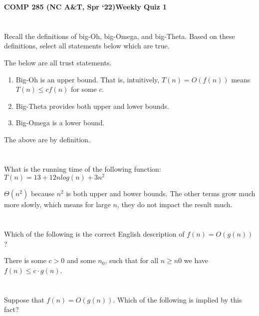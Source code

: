 \documentclass [12pt]{article}
\begin{document}
 

{\LARGE \textbf {COMP 285 (NC A\&T, Spr `22)}\hfill \textbf {Weekly Quiz 1} } 

\section{} Recall the definitions of big-Oh, big-Omega, and big-Theta. Based on these definitions, select all statements below which are true. 

\begin{Solution}
The below are all trust statements.
\begin{enumerate}
    \item Big-Oh is an upper bound. That is, intuitively, $T(n) = O(f(n))$ means $T(n) \leq c f(n)$ for some $c$. 
    \item Big-Theta provides both upper and lower bounds.
    \item Big-Omega is a lower bound.
\end{enumerate}

The above are by definition.
\end{Solution}


\section{} What is the running time of the following function:
$T(n) = 13 + 12nlog(n) + 3n^2$

\begin{Solution}
$\Theta(n^2)$ because $n^2$ is both upper and bower bounds. The other terms grow much more slowly, which means for large $n$, they do not impact the result much.
\end{Solution}


\section{} Which of the following is the correct English description of $f(n) = O(g(n))$?

\begin{Solution}
There is some $c > 0$ and some $n_0$, such that for all $n \geq n0$ we have $f (n) \leq c \cdot g(n)$.
\end{Solution}


\section{} Suppose that $f (n) = O(g(n))$. Which of the following is implied by this fact?
\end{document}
